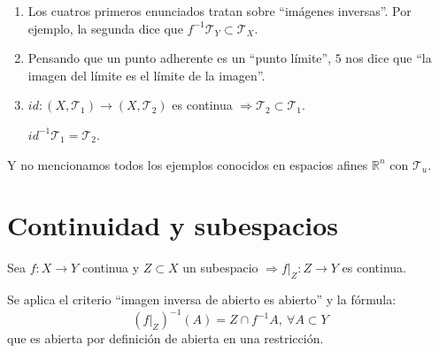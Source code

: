 \begin{obs}
\begin{enumerate}
    \item Los cuatros primeros enunciados tratan sobre ``imágenes inversas''. Por ejemplo, la segunda dice que $f^{-1}\mathcal{T}_Y \subset \mathcal{T}_X$.
    \item Pensando que un punto adherente es un ``punto límite'', $5$ nos dice que ``la imagen del límite es el límite de la imagen''.
    \item $id: \left( X, \mathcal{T}_1 \right) \rightarrow \left( X, \mathcal{T}_2 \right)$ es continua $\Rightarrow \mathcal{T}_2 \subset \mathcal{T}_1$. 
    \begin{demo}
        $id^{-1}\mathcal{T}_1 = \mathcal{T}_2$.
    \end{demo}
\end{enumerate}
Y no mencionamos todos los ejemplos conocidos en espacios afines $\mathbb{R}^n$ con $\mathcal{T}_u$.
\end{obs}


\section{Continuidad y subespacios}%
\label{sec:continuidad_y_subespacios}
\begin{prop}
Sea $f: X \rightarrow Y$ continua y $Z \subset X$ un subespacio $\Rightarrow f|_Z : Z \rightarrow Y$ es continua.
\end{prop}
\begin{demo}
Se aplica el criterio ``imagen inversa de abierto es abierto'' y la fórmula:
\[
\left( f|_Z \right)^{-1} \left( A \right) = Z \cap f^{-1}A,\ \forall A \subset Y
\]
que es abierta por definición de abierta en una restricción.
\end{demo}

